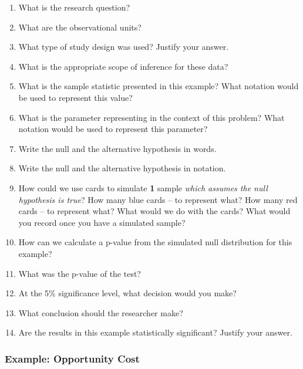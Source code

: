 \documentclass[
]{report}
\newcommand{\rgs}{\vspace{12pt}} %
\begin{document}
\begin{enumerate}
\def\labelenumi{\arabic{enumi}.}
\item
  What is the research question?
  \rgs
\item
  What are the observational units?
  \rgs
\item
  What type of study design was used? Justify your answer.
  \rgs
\item
  What is the appropriate scope of inference for these data?
  \rgs
\item
  What is the sample statistic presented in this example? What notation would be used to represent this value?
  \rgs
\item
  What is the parameter representing in the context of this problem? What notation would be used to represent this parameter?
  \rgs
  \rgs
\item
  Write the null and the alternative hypothesis in words.
  \rgs
  \rgs
\item
  Write the null and the alternative hypothesis in notation.
  \rgs
\item
  How could we use cards to simulate \textbf{1} sample \emph{which assumes the null hypothesis is true}? How many blue cards -- to represent what? How many red cards -- to represent what? What would we do with the cards? What would you record once you have a simulated sample?
  \rgs
  \rgs
\item
  How can we calculate a p-value from the simulated null distribution for this example?
  \rgs
  \rgs
\item
  What was the p-value of the test?
  \rgs
\item
  At the 5\% significance level, what decision would you make?
  \rgs
\item
  What conclusion should the researcher make?
  \rgs
  \rgs
\item
  Are the results in this example statistically significant? Justify your answer.
  \rgs
\end{enumerate}

\hypertarget{example-opportunity-cost}{%
\subsubsection*{Example: Opportunity Cost}\label{example-opportunity-cost}}
\end{document}
